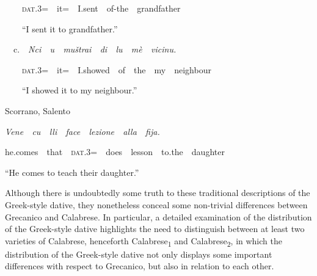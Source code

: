 \documentclass[output=paper,modfonts,nonflat]{langsci/langscibook}
\begin{document}
\begin{styleStandard}
\ \ \ \ \textsc{dat}.3=\ \ it=\ \ I.sent\ \ of-the\ \ grandfather
\end{styleStandard}

\begin{styleStandard}
\ \ \ \ “I sent it to grandfather.”
\end{styleStandard}

\begin{styleStandard}
\ \ c.\ \ \textit{Nci\ \ u\ \ muštrai\ \ di\ \ lu\ \ mè\ \ vicinu.}\ \ 
\end{styleStandard}

\begin{styleStandard}
\ \ \ \ \textsc{dat}.3=\ \ it=\ \ I.showed\ \ of\ \ the\ \ my\ \ neighbour
\end{styleStandard}

\begin{styleStandard}
\ \ \ \ “I showed it to my neighbour.”
\end{styleStandard}

\begin{listWWNumviiileveli}
\item 
\begin{styleListParagraph}
Scorrano, Salento
\end{styleListParagraph}
\end{listWWNumviiileveli}
\begin{styleListParagraph}
\textit{Vene\ \ cu\ \ lli\ \ face\ \ lezione\ \ alla\ \ fija.}
\end{styleListParagraph}

\begin{styleStandard}
he.comes\ \ that\ \ \textsc{dat}.3=\ \ does\ \ lesson\ \ to.the\ \ daughter
\end{styleStandard}

\begin{styleStandard}
“He comes to teach their daughter.”
\end{styleStandard}

\begin{styleStandard}
Although there is undoubtedly some truth to these traditional descriptions of the Greek-style dative, they nonetheless conceal some non-trivial differences between Grecanico and Calabrese. In particular, a detailed examination of the distribution of the Greek-style dative highlights the need to distinguish between at least two varieties of Calabrese, henceforth Calabrese\textsubscript{1} and Calabrese\textsubscript{2}, in which the distribution of the Greek-style dative not only displays some important differences with respect to Grecanico, but also in relation to each other.
\end{styleStandard}
\end{document}

